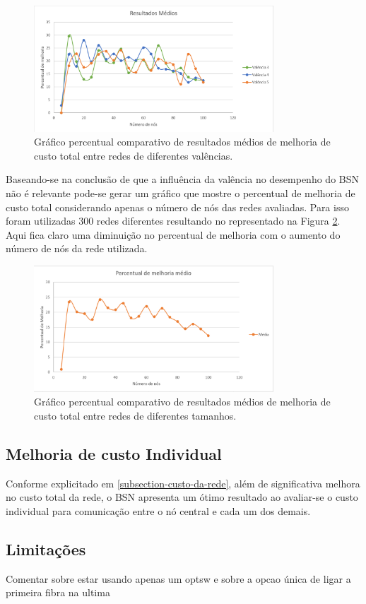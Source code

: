 \begin{figure} [ht]%
	\centering
	\includegraphics[width=0.8\textwidth]{./figuras/BSN-resultados-medios.png} %
	\caption[Melhoria de custo x valência]{Gráfico percentual comparativo de resultados médios de melhoria de custo total entre redes de diferentes valências.}
	\label{fig_graph_bsn_medio}
\end{figure}

Baseando-se na conclusão de que a influência da valência no desempenho do BSN não é relevante pode-se gerar um gráfico que mostre o percentual de melhoria de custo total considerando apenas o número de nós das redes avaliadas. Para isso foram utilizadas 300 redes diferentes resultando no representado na Figura \ref{fig_graph_bsn_medio_all}. Aqui fica claro uma diminuição no percentual de melhoria com o aumento do número de nós da rede utilizada. 

\begin{figure} [ht]%
	\centering
	\includegraphics[width=0.8\textwidth]{./figuras/BSN-resultados-medios-all.png} %
	\caption[Melhoria de custo x tamanho de rede]{Gráfico percentual comparativo de resultados médios de melhoria de custo total entre redes de diferentes tamanhos.}
	\label{fig_graph_bsn_medio_all}
\end{figure}

\subsection{Melhoria de custo Individual}
Conforme explicitado em \ref{subsection-custo-da-rede}, além de significativa melhora no custo total da rede, o BSN apresenta um ótimo resultado ao avaliar-se o custo individual para comunicação entre o nó central e cada um dos demais.

\subsection{Limitações}
Comentar sobre estar usando apenas um optsw e sobre a opcao única de ligar a primeira fibra na ultima
